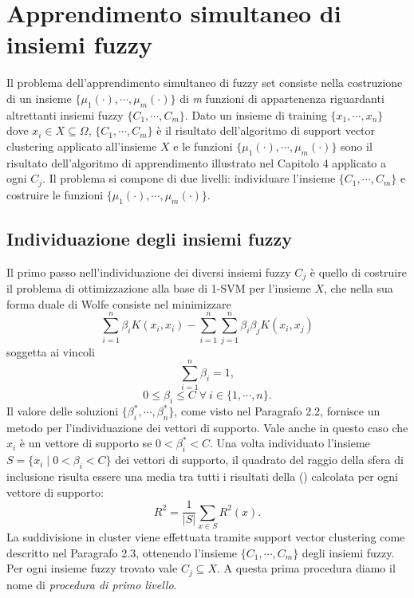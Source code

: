 \documentclass [11pt,a4paper,twoside,openright] {book}
\begin{document}
\chapter{Apprendimento simultaneo di insiemi fuzzy}
Il problema dell'apprendimento simultaneo di fuzzy set \cite{WIRN2018} consiste nella costruzione di un insieme $\lbrace \mu_1(\cdot), \cdots, \mu_m(\cdot) \rbrace$ di \textit{m} funzioni di appartenenza riguardanti altrettanti insiemi fuzzy $\lbrace C_1, \cdots, C_m \rbrace$. Dato un insieme di training $\lbrace x_1, \cdots, x_n \rbrace$ dove $ x_i \in X \subseteq \Omega$, $\lbrace C_1, \cdots, C_m \rbrace$ è il risultato dell'algoritmo di support vector clustering applicato all'insieme $X$ e le funzioni $\lbrace \mu_1(\cdot), \cdots, \mu_m(\cdot) \rbrace$ sono il risultato dell'algoritmo di apprendimento illustrato nel Capitolo 4 applicato a ogni $C_j$. Il problema si compone di due livelli: individuare l'insieme $\lbrace C_1, \cdots, C_m \rbrace$ e costruire le funzioni $\lbrace \mu_1(\cdot), \cdots, \mu_m(\cdot) \rbrace$.
\section{Individuazione degli insiemi fuzzy}
Il primo passo nell'individuazione dei diversi insiemi fuzzy $C_j$ è quello di costruire il problema di ottimizzazione alla base di 1-SVM per l'insieme $X$, che nella sua forma duale di Wolfe consiste nel minimizzare
\begin{equation}\label{wolfegurobi}
\sum_{i=1}^n\beta_iK(x_i,x_i) - \sum_{i=1}^n\sum_{j=1}^n\beta_i\beta_jK(x_i,x_j) 
\end{equation}
soggetta ai vincoli
\begin{equation}\label{uno}
\sum_{i=1}^n \beta_i = 1,
\end{equation}
\begin{equation}
0 \leq \beta_i \leq C \; \forall \: i \in \lbrace 1, \cdots, n\rbrace.
\end{equation}
Il valore delle soluzioni $\lbrace \beta_i^*, \cdots, \beta_n^* \rbrace$, come visto nel Paragrafo 2.2, fornisce un metodo per l'individuazione dei vettori di supporto. Vale anche in questo caso che $x_i$ è un vettore di supporto se  $0 < \beta_i^* < C.$
Una volta individuato l'insieme $S = \lbrace x_i \; | \; 0 < \beta_i < C \rbrace$ dei vettori di supporto, il quadrato del raggio della sfera di inclusione risulta essere una media tra tutti i risultati della () calcolata per ogni vettore di supporto:
\begin{equation}
R^2 = \dfrac{1}{|S|}\sum_{x \in S} R^2(x).
\end{equation}
La suddivisione in cluster viene effettuata tramite support vector clustering come descritto nel Paragrafo 2.3, ottenendo l'insieme $\lbrace C_1, \cdots, C_m \rbrace$ degli insiemi fuzzy. Per ogni insieme fuzzy trovato vale $C_j \subseteq X$. A questa prima procedura diamo il nome di \textit{procedura di primo livello}.
\end{document}
